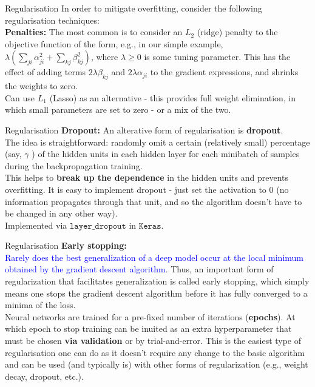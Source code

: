 \documentclass{beamer}
\begin{document}
\begin{frame}{Regularisation}
In order to mitigate overfitting, consider the following regularisation techniques:\\
\textbf{Penalties:}
The most common is to consider an $L_{2}$ (ridge) penalty to the objective function of the form, e.g., in our simple example, $\lambda\left(\sum_{j i} \alpha_{j i}^{2}+\sum_{k j} \beta_{k j}^{2}\right)$, where $\lambda \geq 0$ is some tuning parameter. This has the effect of adding terms $2 \lambda \beta_{k j}$ and $2 \lambda \alpha_{j i}$ to the gradient expressions, and shrinks the weights to zero.\\

Can use $L_{1}$ (Lasso) as an alternative - this provides full weight elimination, in which small parameters are set to zero - or a mix of the two.
\end{frame}
\begin{frame}{Regularisation}
\textbf{Dropout:}
An alterative form of regularisation is \textbf{dropout}.\\
The idea is straightforward: randomly omit a certain (relatively small) percentage (say, $\gamma$ ) of the hidden units in each hidden layer for each minibatch of samples during the backpropagation training.\\
This helps to \textbf{break up the dependence} in the hidden units and prevents overfitting. It is easy to implement dropout - just set the activation to 0 (no information propagates through that unit, and so the algorithm doesn't have to be changed in any other way).\\

Implemented via $\texttt{layer\_dropout}$ in $\texttt{Keras}$.
\end{frame}
\begin{frame}{Regularisation}
\textbf{Early stopping:}\\
\textcolor{blue}{Rarely does the best generalization of a deep model occur at the local minimum obtained by the gradient descent algorithm}. Thus, an important form of regularization that facilitates generalization is called early stopping, which simply means one stops the gradient descent algorithm before it has fully converged to a minima of the loss.\\
Neural networks are trained for a pre-fixed number of iterations (\textbf{epochs}). At which epoch to stop training can be inuited as an extra hyperparameter that must be chosen \textbf{via validation} or by trial-and-error. This is the easiest type of regularisation one can do as it doesn't require any change to the basic algorithm and can be used (and typically is) with other forms of regularization (e.g., weight decay, dropout, etc.).
\end{frame}
\end{document}
